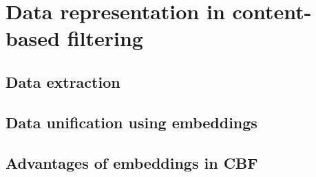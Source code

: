 \section{Data representation in content-based filtering}\label{sec:cbf_data_rep}

\subsection{Data extraction} %

\subsection{Data unification using embeddings} %

\subsection{Advantages of embeddings in CBF} %